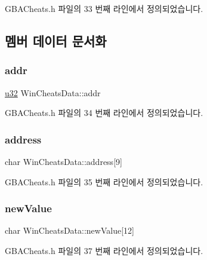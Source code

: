 G\+B\+A\+Cheats.\+h 파일의 33 번째 라인에서 정의되었습니다.



\subsection{멤버 데이터 문서화}
\mbox{\label{struct_win_cheats_data_ace7d56c82bf83c2d88a5c1d6555b0b50}} 
\subsubsection{\texorpdfstring{addr}{addr}}
{\footnotesize\ttfamily \mbox{\hyperlink{_system_8h_a10e94b422ef0c20dcdec20d31a1f5049}{u32}} Win\+Cheats\+Data\+::addr}



G\+B\+A\+Cheats.\+h 파일의 34 번째 라인에서 정의되었습니다.

\mbox{\label{struct_win_cheats_data_aee18406386236acfb28aa838a027b5b2}} 
\subsubsection{\texorpdfstring{address}{address}}
{\footnotesize\ttfamily char Win\+Cheats\+Data\+::address\mbox{[}9\mbox{]}}



G\+B\+A\+Cheats.\+h 파일의 35 번째 라인에서 정의되었습니다.

\mbox{\label{struct_win_cheats_data_ae00918c0a8daa1d847eaac10d63fd559}} 
\subsubsection{\texorpdfstring{new\+Value}{newValue}}
{\footnotesize\ttfamily char Win\+Cheats\+Data\+::new\+Value\mbox{[}12\mbox{]}}



G\+B\+A\+Cheats.\+h 파일의 37 번째 라인에서 정의되었습니다.

